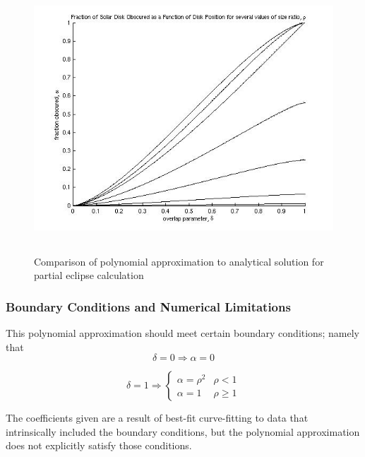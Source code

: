     \begin{figure}[!ht]
      \includegraphics[height=100mm]{figs/shadow/shadow_calculator_fig7.jpg}

      \caption{Comparison of polynomial approximation to analytical solution for
      partial eclipse calculation}
      \label{fig:shadow_calc7}
    \end{figure}

   \subsubsection {Boundary Conditions and Numerical Limitations} \bigskip

    This polynomial approximation should meet certain boundary conditions;
    namely that
    \begin{equation*}
    \delta =0\Rightarrow \alpha =0
    \end{equation*}

    \begin{equation*}
      \delta = 1 \Rightarrow
      \begin{cases}
        \alpha =\rho ^{2}  &  \rho <1 \\
        \alpha =1            &  \rho \geqslant 1
      \end{cases}
    \end{equation*}

    The coefficients given are a result of best{}-fit curve{}-fitting to data
    that intrinsically included the boundary conditions, but the polynomial
    approximation does not explicitly satisfy those conditions.

